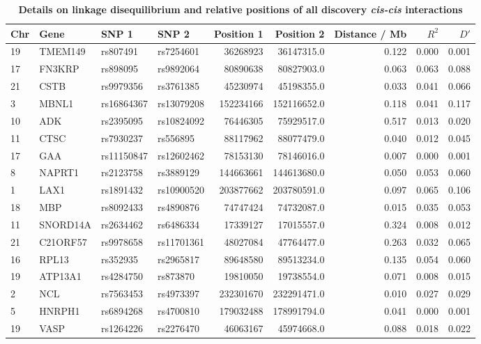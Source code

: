 \documentclass{article}
\begin{document}
\begin{table}[ht]
{\footnotesize
\begin{threeparttable}
\caption{\textbf{Details on linkage disequilibrium and relative positions of all discovery \emph{cis-cis} interactions}}
\label{tab:ld}
\begin{tabular}{llllrrrrr}


  \hline
Chr & Gene & SNP 1 & SNP 2 & Position 1 & Position 2 & Distance / Mb & $R^2$ & $D'$ \\
  \hline
19 & TMEM149 & rs807491 & rs7254601 & 36268923 & 36147315.0 & 0.122 & 0.000 & 0.001 \\
  17 & FN3KRP & rs898095 & rs9892064 & 80890638 & 80827903.0 & 0.063 & 0.063 & 0.088 \\
  21 & CSTB & rs9979356 & rs3761385 & 45230974 & 45198355.0 & 0.033 & 0.041 & 0.066 \\
  3 & MBNL1 & rs16864367 & rs13079208 & 152234166 & 152116652.0 & 0.118 & 0.041 & 0.117 \\
  10 & ADK & rs2395095 & rs10824092 & 76446305 & 75929517.0 & 0.517 & 0.013 & 0.020 \\
  11 & CTSC & rs7930237 & rs556895 & 88117962 & 88077479.0 & 0.040 & 0.012 & 0.045 \\
  17 & GAA & rs11150847 & rs12602462 & 78153130 & 78146016.0 & 0.007 & 0.000 & 0.001 \\
  8 & NAPRT1 & rs2123758 & rs3889129 & 144663661 & 144613680.0 & 0.050 & 0.053 & 0.060 \\
  1 & LAX1 & rs1891432 & rs10900520 & 203877662 & 203780591.0 & 0.097 & 0.065 & 0.106 \\
  18 & MBP & rs8092433 & rs4890876 & 74747424 & 74732087.0 & 0.015 & 0.035 & 0.053 \\
  11 & SNORD14A & rs2634462 & rs6486334 & 17339127 & 17015557.0 & 0.324 & 0.008 & 0.012 \\
  21 & C21ORF57 & rs9978658 & rs11701361 & 48027084 & 47764477.0 & 0.263 & 0.032 & 0.065 \\
  16 & RPL13 & rs352935 & rs2965817 & 89648580 & 89513234.0 & 0.135 & 0.054 & 0.060 \\
  19 & ATP13A1 & rs4284750 & rs873870 & 19810050 & 19738554.0 & 0.071 & 0.008 & 0.015 \\
  2 & NCL & rs7563453 & rs4973397 & 232301670 & 232291471.0 & 0.010 & 0.027 & 0.029 \\
  5 & HNRPH1 & rs6894268 & rs4700810 & 179032488 & 178991794.0 & 0.041 & 0.000 & 0.001 \\
  19 & VASP & rs1264226 & rs2276470 & 46063167 & 45974668.0 & 0.088 & 0.018 & 0.022 \\

\end{tabular}
\end{threeparttable}}
\end{table}
\end{document}

